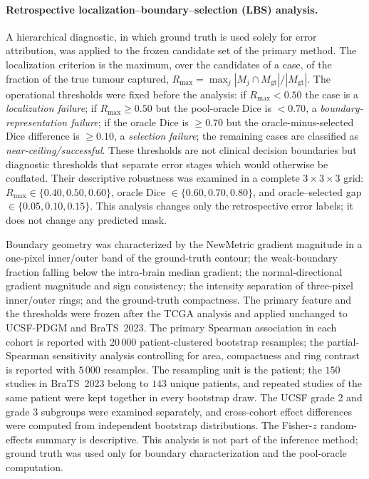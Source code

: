 \documentclass[11pt,a4paper]{article}
\begin{document}
\paragraph{Retrospective localization--boundary--selection (LBS) analysis.} A
hierarchical diagnostic, in which ground truth is used solely for error
attribution, was applied to the frozen candidate set of the primary method. The
localization criterion is the maximum, over the candidates of a case, of the
fraction of the true tumour captured,
$R_{\max}=\max_j |M_j\cap M_{\mathrm{gt}}|/|M_{\mathrm{gt}}|$. The operational
thresholds were fixed before the analysis: if $R_{\max}<0.50$ the case is a
\emph{localization failure}; if $R_{\max}\ge0.50$ but the pool-oracle Dice is
$<0.70$, a \emph{boundary-representation failure}; if the oracle Dice is $\ge0.70$
but the oracle-minus-selected Dice difference is $\ge0.10$, a \emph{selection
failure}; the remaining cases are classified as \emph{near-ceiling/successful}.
These thresholds are not clinical decision boundaries but diagnostic thresholds
that separate error stages which would otherwise be conflated.
Their descriptive robustness was examined in a complete $3\times3\times3$ grid:
$R_{\max}\in\{0.40,0.50,0.60\}$, oracle Dice
$\in\{0.60,0.70,0.80\}$, and oracle--selected gap
$\in\{0.05,0.10,0.15\}$. This analysis changes only the retrospective error
labels; it does not change any predicted mask.

Boundary geometry was characterized by the NewMetric gradient magnitude in a
one-pixel inner/outer band of the ground-truth contour; the weak-boundary fraction
falling below the intra-brain median gradient; the normal-directional gradient
magnitude and sign consistency; the intensity separation of three-pixel
inner/outer rings; and the ground-truth compactness. The primary feature and the
thresholds were frozen after the TCGA analysis and applied unchanged to UCSF-PDGM
and BraTS~2023. The primary Spearman association in each cohort is reported with
$20\,000$ patient-clustered bootstrap resamples; the
partial-Spearman sensitivity analysis controlling for area, compactness and ring
contrast is reported with $5\,000$ resamples. The resampling unit is the patient;
the $150$ studies in BraTS~2023 belong to $143$ unique patients, and repeated
studies of the same patient were kept together in every bootstrap draw. The UCSF
grade 2 and grade 3 subgroups were examined separately, and cross-cohort effect
differences were computed from independent bootstrap distributions. The Fisher-$z$
random-effects summary is descriptive. This analysis is not part of the inference
method; ground truth was used only for boundary characterization and the
pool-oracle computation.
\end{document}
